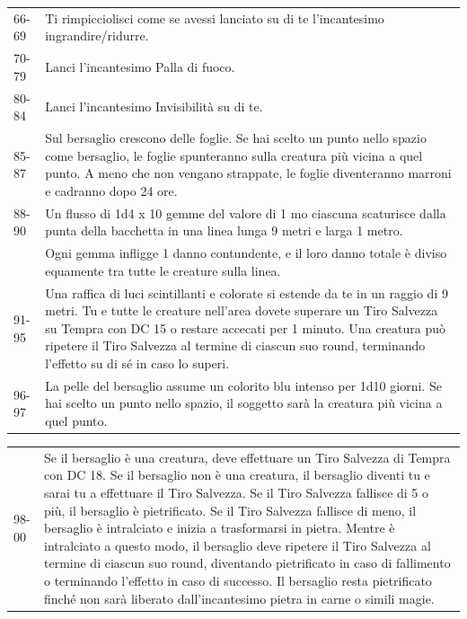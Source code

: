 \begin{multicols}{2}
\begin{tabularx}{0.50\textwidth}{lX}
66-69 &Ti rimpicciolisci come se avessi lanciato su di te l'incantesimo ingrandire/ridurre.\\
70-79 &Lanci l'incantesimo Palla di fuoco.\\
80-84 &Lanci l'incantesimo Invisibilità su di te.\\
85-87 &Sul bersaglio crescono delle foglie. Se hai scelto un punto nello spazio come bersaglio, le foglie spunteranno sulla creatura più vicina a quel punto. A meno che non vengano strappate, le foglie diventeranno marroni e cadranno dopo 24 ore.\\
88-90& Un flusso di 1d4 x 10 gemme del valore di 1 mo ciascuna scaturisce dalla punta della bacchetta in una linea lunga 9 metri e larga 1 metro.\\
& Ogni gemma infligge 1 danno contundente, e il loro danno totale è diviso equamente tra tutte le creature sulla linea.\\
91-95 &Una raffica di luci scintillanti e colorate si estende da te in un raggio di 9 metri. Tu e tutte le creature nell'area dovete superare un Tiro Salvezza su Tempra con DC 15 o restare accecati per 1 minuto. Una creatura può ripetere il Tiro Salvezza al termine di ciascun suo round, terminando l'effetto su di sé in caso lo superi.\\
96-97 &La pelle del bersaglio assume un colorito blu intenso per 1d10 giorni. Se hai scelto un punto nello spazio, il soggetto sarà la creatura più vicina a quel punto.\\
\end{tabularx}
\noindent\begin{tabularx}{0.50\textwidth}{lX}
98-00 &Se il bersaglio è una creatura, deve effettuare un Tiro Salvezza di Tempra con DC 18. Se il bersaglio non è una creatura, il bersaglio diventi tu e sarai tu a effettuare il Tiro Salvezza. Se il Tiro Salvezza fallisce di 5 o più, il bersaglio è pietrificato. Se il Tiro Salvezza fallisce di meno, il bersaglio è intralciato e inizia a trasformarsi in pietra. Mentre è intralciato a questo modo, il bersaglio deve ripetere il Tiro Salvezza al termine di ciascun suo round, diventando pietrificato in caso di fallimento o terminando l'effetto in caso di successo. Il bersaglio resta pietrificato finché non sarà liberato dall'incantesimo pietra in carne o simili magie.\\
\end{tabularx}




\end{multicols}
